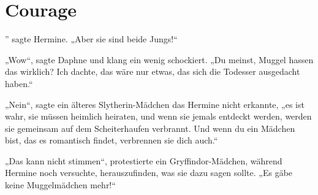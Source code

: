 \chapter{Courage}

” sagte Hermine. „Aber sie sind beide Jungs!“

\hplettrineextrapara
„Wow“, sagte Daphne und klang ein wenig schockiert. „Du meinst, Muggel hassen das wirklich? Ich dachte, das wäre nur etwas, das sich die Todesser ausgedacht haben.“

„Nein“, sagte ein älteres Slytherin-Mädchen das Hermine nicht erkannte, „es ist wahr, sie müssen heimlich heiraten, und wenn sie jemals entdeckt werden, werden sie gemeinsam auf dem Scheiterhaufen verbrannt. Und wenn du ein Mädchen bist, das es romantisch findet, verbrennen sie dich auch.“

„Das kann nicht stimmen“, protestierte ein Gryffindor-Mädchen, während Hermine noch versuchte, herauszufinden, was sie dazu sagen sollte. „Es gäbe keine Muggelmädchen mehr!“

